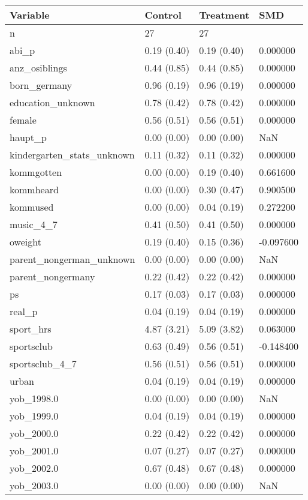 \begin{tabular}{llll}
\toprule
Variable & Control & Treatment & SMD \\
\midrule
n & 27 & 27 &  \\
abi\_p & 0.19 (0.40) & 0.19 (0.40) & 0.000000 \\
anz\_osiblings & 0.44 (0.85) & 0.44 (0.85) & 0.000000 \\
born\_germany & 0.96 (0.19) & 0.96 (0.19) & 0.000000 \\
education\_unknown & 0.78 (0.42) & 0.78 (0.42) & 0.000000 \\
female & 0.56 (0.51) & 0.56 (0.51) & 0.000000 \\
haupt\_p & 0.00 (0.00) & 0.00 (0.00) & NaN \\
kindergarten\_stats\_unknown & 0.11 (0.32) & 0.11 (0.32) & 0.000000 \\
kommgotten & 0.00 (0.00) & 0.19 (0.40) & 0.661600 \\
kommheard & 0.00 (0.00) & 0.30 (0.47) & 0.900500 \\
kommused & 0.00 (0.00) & 0.04 (0.19) & 0.272200 \\
music\_4\_7 & 0.41 (0.50) & 0.41 (0.50) & 0.000000 \\
oweight & 0.19 (0.40) & 0.15 (0.36) & -0.097600 \\
parent\_nongerman\_unknown & 0.00 (0.00) & 0.00 (0.00) & NaN \\
parent\_nongermany & 0.22 (0.42) & 0.22 (0.42) & 0.000000 \\
ps & 0.17 (0.03) & 0.17 (0.03) & 0.000000 \\
real\_p & 0.04 (0.19) & 0.04 (0.19) & 0.000000 \\
sport\_hrs & 4.87 (3.21) & 5.09 (3.82) & 0.063000 \\
sportsclub & 0.63 (0.49) & 0.56 (0.51) & -0.148400 \\
sportsclub\_4\_7 & 0.56 (0.51) & 0.56 (0.51) & 0.000000 \\
urban & 0.04 (0.19) & 0.04 (0.19) & 0.000000 \\
yob\_1998.0 & 0.00 (0.00) & 0.00 (0.00) & NaN \\
yob\_1999.0 & 0.04 (0.19) & 0.04 (0.19) & 0.000000 \\
yob\_2000.0 & 0.22 (0.42) & 0.22 (0.42) & 0.000000 \\
yob\_2001.0 & 0.07 (0.27) & 0.07 (0.27) & 0.000000 \\
yob\_2002.0 & 0.67 (0.48) & 0.67 (0.48) & 0.000000 \\
yob\_2003.0 & 0.00 (0.00) & 0.00 (0.00) & NaN \\
\bottomrule
\end{tabular}
